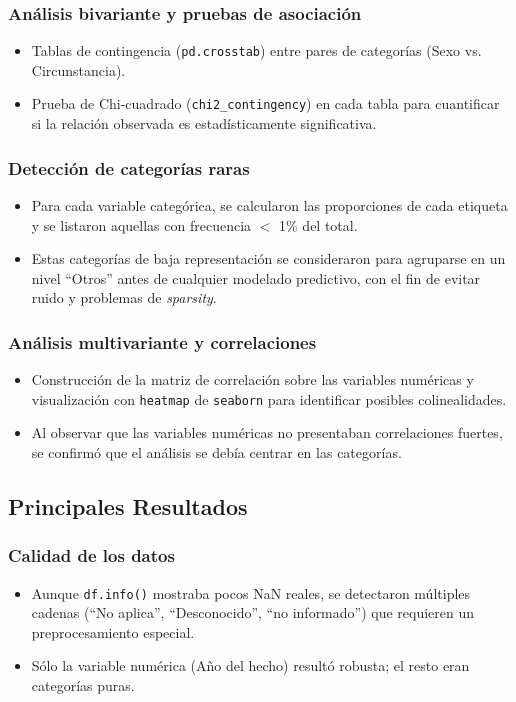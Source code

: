 \documentclass[lettersize,journal]{IEEEtran}
\begin{document}
\subsubsection{Análisis bivariante y pruebas de asociación}
\begin{itemize}
    \item Tablas de contingencia (\texttt{pd.crosstab}) entre pares de categorías (Sexo vs. Circunstancia).
    \item Prueba de Chi-cuadrado (\texttt{chi2\_contingency}) en cada tabla para cuantificar si la relación observada es estadísticamente significativa.
\end{itemize}

\subsubsection{Detección de categorías raras}
\begin{itemize}
    \item Para cada variable categórica, se calcularon las proporciones de cada etiqueta y se listaron aquellas con frecuencia $<$ 1\% del total.
    \item Estas categorías de baja representación se consideraron para agruparse en un nivel “Otros” antes de cualquier modelado predictivo, con el fin de evitar ruido y problemas de \textit{sparsity}.
\end{itemize}

\subsubsection{Análisis multivariante y correlaciones}
\begin{itemize}
    \item Construcción de la matriz de correlación sobre las variables numéricas y visualización con \texttt{heatmap} de \texttt{seaborn} para identificar posibles colinealidades.
    \item Al observar que las variables numéricas no presentaban correlaciones fuertes, se confirmó que el análisis se debía centrar en las categorías.
\end{itemize}

\subsection{Principales Resultados}

\subsubsection{Calidad de los datos}
\begin{itemize}
    \item Aunque \texttt{df.info()} mostraba pocos NaN reales, se detectaron múltiples cadenas (“No aplica”, “Desconocido”, “no informado”) que requieren un preprocesamiento especial.
    \item Sólo la variable numérica (Año del hecho) resultó robusta; el resto eran categorías puras.
\end{itemize}
\end{document}
